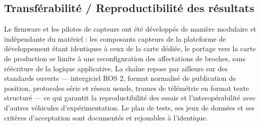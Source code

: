 \subsection{Transférabilité / Reproductibilité des résultats}

Le firmware et les pilotes de capteurs ont été développés de manière modulaire et indépendante du matériel : les composants capteurs de la plateforme de développement étant identiques à ceux de la carte dédiée, le portage vers la carte de production se limite à une reconfiguration des affectations de broches, sans réécriture de la logique applicative. La chaîne repose par ailleurs sur des standards ouverts — intergiciel ROS 2, format normalisé de publication de position, protocoles série et réseau usuels, trames de télémétrie en format texte structuré — ce qui garantit la reproductibilité des essais et l’interopérabilité avec d’autres véhicules d’expérimentation. Le plan de tests, ses jeux de données et ses critères d’acceptation sont documentés et rejouables à l’identique.

